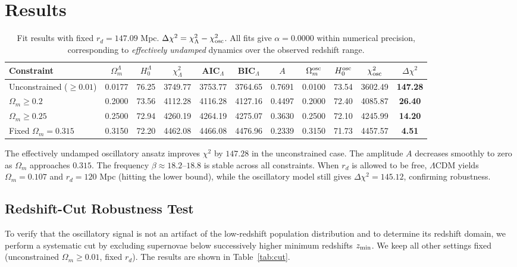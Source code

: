 \documentclass[10pt,a4paper,twocolumn]{article}
\begin{document}
\section{Results}
\begin{table}[ht]
\centering
\setlength{\tabcolsep}{3.2pt}
\caption{\label{tab:results}Fit results with fixed $r_d=147.09$ Mpc. $\Delta\chi^2 = \chi^2_{\Lambda} - \chi^2_{\rm osc}$. All fits give $\alpha=0.0000$ within numerical precision, corresponding to \emph{effectively undamped} dynamics over the observed redshift range.}
\begin{tabular}{lcccccccccc}
\toprule
Constraint & $\Omega_m^\Lambda$ & $H_0^\Lambda$ & $\chi^2_\Lambda$ & AIC$_\Lambda$ & BIC$_\Lambda$ & $A$ & $\Omega_m^{\rm osc}$ & $H_0^{\rm osc}$ & $\chi^2_{\rm osc}$ & $\Delta\chi^2$ \\
\midrule
Unconstrained ($\ge0.01$) & 0.0177 & 76.25 & 3749.77 & 3753.77 & 3764.65 & 0.7691 & 0.0100 & 73.54 & 3602.49 & \textbf{147.28} \\
$\Omega_m\ge0.2$         & 0.2000 & 73.56 & 4112.28 & 4116.28 & 4127.16 & 0.4497 & 0.2000 & 72.40 & 4085.87 & \textbf{26.40} \\
$\Omega_m\ge0.25$        & 0.2500 & 72.94 & 4260.19 & 4264.19 & 4275.07 & 0.3630 & 0.2500 & 72.10 & 4245.99 & \textbf{14.20} \\
Fixed $\Omega_m=0.315$   & 0.3150 & 72.20 & 4462.08 & 4466.08 & 4476.96 & 0.2339 & 0.3150 & 71.73 & 4457.57 & \textbf{4.51} \\
\bottomrule
\end{tabular}
\end{table}

The effectively undamped oscillatory ansatz improves $\chi^2$ by $147.28$ in the unconstrained case. The amplitude $A$ decreases smoothly to zero as $\Omega_m$ approaches $0.315$. The frequency $\beta\approx18.2$–$18.8$ is stable across all constraints. When $r_d$ is allowed to be free, $\Lambda$CDM yields $\Omega_m=0.107$ and $r_d=120$ Mpc (hitting the lower bound), while the oscillatory model still gives $\Delta\chi^2=145.12$, confirming robustness.

\subsection{Redshift-Cut Robustness Test}
To verify that the oscillatory signal is not an artifact of the low-redshift population distribution and to determine its redshift domain, we perform a systematic cut by excluding supernovae below successively higher minimum redshifts $z_{\rm min}$. We keep all other settings fixed (unconstrained $\Omega_m\ge0.01$, fixed $r_d$). The results are shown in Table~\ref{tab:cut}.
\end{document}
